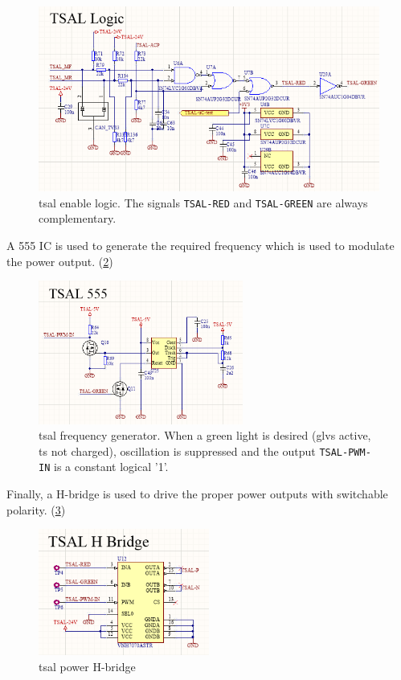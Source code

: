 \begin{figure}[H]
	\centering
	\includegraphics[width=\textwidth]{./img/TSAL-logic.png}
	\caption[TSAL enable logic]{\Gls{tsal} enable logic. The signals \texttt{TSAL-RED} and \texttt{TSAL-GREEN} are always complementary.}
	\label{fig:TSAL-logic}
\end{figure}

A 555 IC is used to generate the required frequency which is used to modulate the power output. (\ref{fig:TSAL-555})

\begin{figure}[H]
	\centering
	\includegraphics[width=0.6\textwidth]{./img/TSAL-555.png}
	\caption[TSAL frequency generator]{\gls{tsal} frequency generator. When a green light is desired (\gls{glvs} active, \gls{ts} not charged), oscillation is suppressed and the output \texttt{TSAL-PWM-IN} is a constant logical '1'.}
	\label{fig:TSAL-555}
\end{figure}

Finally, a H-bridge is used to drive the proper power outputs with switchable polarity. (\ref{fig:TSAL-H-bridge})

\begin{figure}[H]
	\centering
	\includegraphics[width=0.5\textwidth]{./img/TSAL-H-bridge.png}
	\caption{\gls{tsal} power H-bridge}
	\label{fig:TSAL-H-bridge}
\end{figure}

